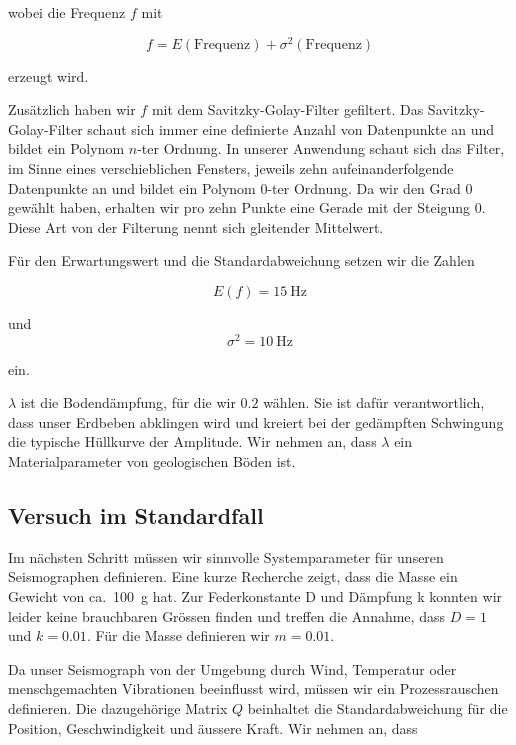 wobei die Frequenz $f$ mit

\begin{equation}
	f = E(\mathrm{Frequenz}) + \sigma^2(\mathrm{Frequenz})
\end{equation}

erzeugt wird.

Zusätzlich haben wir $f$ mit dem Savitzky-Golay-Filter gefiltert.
Das Savitzky-Golay-Filter schaut sich immer eine definierte Anzahl von Datenpunkte an
und bildet ein Polynom $n$-ter Ordnung.
In unserer Anwendung schaut sich das Filter, im Sinne eines verschieblichen Fensters,
jeweils zehn aufeinanderfolgende Datenpunkte an und bildet ein Polynom $0$-ter Ordnung.
Da wir den Grad $0$ gewählt haben, erhalten wir pro zehn Punkte eine Gerade mit der Steigung $0$.
Diese Art von der Filterung nennt sich gleitender Mittelwert.

Für den Erwartungswert und die Standardabweichung setzen wir die Zahlen

\begin{equation}
E(f) = \SI{15}{\hertz}
\end{equation}

und
\begin{equation}
\sigma^2 = \SI{10}{\hertz}
\end{equation}

ein.

$\lambda$ ist die Bodendämpfung, für die wir $0.2$ wählen.
Sie ist dafür verantwortlich, dass unser Erdbeben abklingen wird und kreiert bei der gedämpften Schwingung die typische Hüllkurve der Amplitude.
Wir nehmen an, dass $\lambda$ ein Materialparameter von geologischen Böden ist.

\subsection{Versuch im Standardfall}
Im nächsten Schritt müssen wir sinnvolle Systemparameter für unseren Seismographen definieren.
Eine kurze Recherche zeigt, dass die Masse ein Gewicht von ca.\ \SI{100}{\gram} hat.
Zur Federkonstante D und Dämpfung k konnten wir leider keine brauchbaren Grössen finden und treffen die Annahme, dass $D = 1$ und $k = 0.01$.
Für die Masse definieren wir $m = 0.01$.

Da unser Seismograph von der Umgebung durch Wind, Temperatur oder menschgemachten Vibrationen beeinflusst wird, müssen wir ein Prozessrauschen definieren.
Die dazugehörige Matrix $Q$ beinhaltet die Standardabweichung für die Position, Geschwindigkeit und äussere Kraft.
Wir nehmen an, dass

